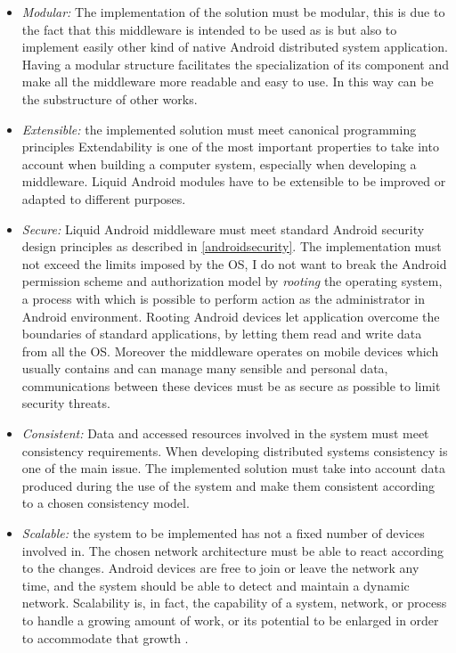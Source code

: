 \begin{itemize}
	\item \textit{Modular:} The implementation of the solution must be modular, this is due to the fact that this middleware is intended to be used as is but also to implement easily other kind of native Android distributed system application. Having a modular structure facilitates the specialization of its component and make all the middleware more readable and easy to use. In this way  can be the substructure of other works.
	
	\item \textit{Extensible:} the implemented solution must meet canonical programming principles Extendability is one of the most important properties to take into account when building a computer system, especially when developing a middleware. Liquid Android modules have to be extensible to be improved or adapted to different purposes.
		
	\item \textit{Secure:} Liquid Android middleware must meet standard Android security design principles as described in \ref{androidsecurity}. The implementation must not exceed the limits imposed by the OS, I do not want to break the Android permission scheme and authorization model by \textit{rooting} the operating system, a process with which is possible to perform action as the administrator in Android environment. Rooting Android devices let application overcome the boundaries of standard applications, by letting them read and write data from all the OS. Moreover the middleware operates on mobile devices which usually contains and can manage many sensible and personal data, communications between these devices must be as secure as possible to limit security threats.
	
	\item \textit{Consistent:} Data and accessed resources involved in the system must meet consistency requirements. When developing distributed systems consistency is one of the main issue. The implemented solution must take into account data produced during the use of the system and make them consistent according to a chosen consistency model.
	
	\item \textit{Scalable:} the system to be implemented has not a fixed number of devices involved in. The chosen network architecture must be able to react according to the changes. Android devices are free to join or leave the network any time, and the system should be able to detect and maintain a dynamic network. Scalability is, in fact, the capability of a system, network, or process to handle a growing amount of work, or its potential to be enlarged in order to accommodate that growth \cite{bondi2000characteristics}. 
	

\end{itemize}
